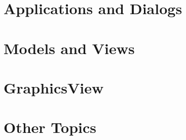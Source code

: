\documentclass[t]{beamer}
\begin{document}
\part{Applications and Dialogs}



\part{Models and Views}



\part{GraphicsView}


%

\part{Other Topics}




\end{document}
